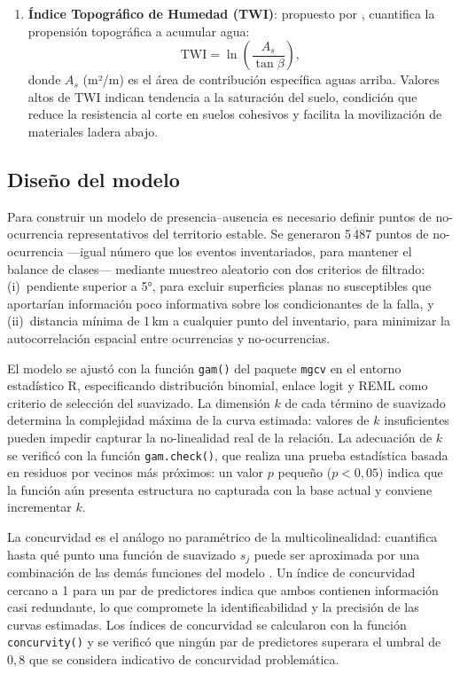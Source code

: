 \documentclass[12pt,a4paper]{article}
\begin{document}
\begin{enumerate}
\item \textbf{Índice Topográfico de Humedad (TWI)}: propuesto por
\citet{beven1979physically}, cuantifica la propensión topográfica
a acumular agua:
\begin{equation}
    \mathrm{TWI} = \ln\!\left(\frac{A_s}{\tan\beta}\right),
    \label{eq:twi}
\end{equation}
donde $A_s$ (m²/m) es el área de contribución específica aguas
arriba. Valores altos de TWI indican tendencia a la saturación del
suelo, condición que reduce la resistencia al corte en suelos
cohesivos y facilita la movilización de materiales ladera abajo.

\end{enumerate}

\subsection{Diseño del modelo}

Para construir un modelo de presencia--ausencia es necesario definir
puntos de no-ocurrencia representativos del territorio estable.
Se generaron 5\,487 puntos de no-ocurrencia ---igual número que los
eventos inventariados, para mantener el balance de clases--- mediante
muestreo aleatorio con dos criterios de filtrado:
(i)~pendiente superior a 5°, para excluir superficies planas no
susceptibles que aportarían información poco informativa sobre los
condicionantes de la falla, y
(ii)~distancia mínima de 1\,km a cualquier punto del inventario, para
minimizar la autocorrelación espacial entre ocurrencias y
no-ocurrencias.

El modelo se ajustó con la función \texttt{gam()} del paquete
\texttt{mgcv} \citep{wood2017generalized} en el entorno estadístico R,
especificando distribución binomial, enlace logit y REML como criterio
de selección del suavizado. La dimensión $k$ de cada término de
suavizado determina la complejidad máxima de la curva estimada: valores
de $k$ insuficientes pueden impedir capturar la no-linealidad real de
la relación. La adecuación de $k$ se verificó con la función
\texttt{gam.check()}, que realiza una prueba estadística basada en
residuos por vecinos más próximos: un valor $p$ pequeño ($p < 0{,}05$)
indica que la función aún presenta estructura no capturada con la base
actual y conviene incrementar $k$.

La concurvidad es el análogo no paramétrico de la multicolinealidad:
cuantifica hasta qué punto una función de suavizado $s_j$ puede ser
aproximada por una combinación de las demás funciones del modelo
\citep{wood2017generalized}. Un índice de concurvidad cercano a 1 para
un par de predictores indica que ambos contienen información casi
redundante, lo que compromete la identificabilidad y la precisión de
las curvas estimadas. Los índices de concurvidad se calcularon con la
función \texttt{concurvity()} y se verificó que ningún par de
predictores superara el umbral de $0{,}8$ que se considera indicativo
de concurvidad problemática.
\end{document}
